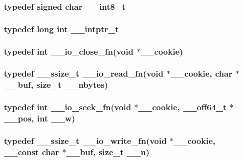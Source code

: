 \subsubsection[{\_\-\_\-int8\_\-t}]{\setlength{\rightskip}{0pt plus 5cm}typedef signed char {\bf \_\-\_\-int8\_\-t}}\label{tp_8c_ad354a21de2c1a620441cb09b93f96031}
\subsubsection[{\_\-\_\-intptr\_\-t}]{\setlength{\rightskip}{0pt plus 5cm}typedef long int {\bf \_\-\_\-intptr\_\-t}}\label{tp_8c_a075fd5c40c4d73666419b71350a65634}
\subsubsection[{\_\-\_\-io\_\-close\_\-fn}]{\setlength{\rightskip}{0pt plus 5cm}typedef int {\bf \_\-\_\-io\_\-close\_\-fn}(void $\ast$\_\-\_\-cookie)}\label{tp_8c_a6786b9a023567289213209656e55df6e}
\subsubsection[{\_\-\_\-io\_\-read\_\-fn}]{\setlength{\rightskip}{0pt plus 5cm}typedef {\bf \_\-\_\-ssize\_\-t} {\bf \_\-\_\-io\_\-read\_\-fn}(void $\ast$\_\-\_\-cookie, char $\ast$\_\-\_\-buf, {\bf size\_\-t} \_\-\_\-nbytes)}\label{tp_8c_ae0606271c38e8806f8183247cad8dcc7}
\subsubsection[{\_\-\_\-io\_\-seek\_\-fn}]{\setlength{\rightskip}{0pt plus 5cm}typedef int {\bf \_\-\_\-io\_\-seek\_\-fn}(void $\ast$\_\-\_\-cookie, {\bf \_\-\_\-off64\_\-t} $\ast$\_\-\_\-pos, int \_\-\_\-w)}\label{tp_8c_acbd4eda6a8012467619139ad9802a38d}
\subsubsection[{\_\-\_\-io\_\-write\_\-fn}]{\setlength{\rightskip}{0pt plus 5cm}typedef {\bf \_\-\_\-ssize\_\-t} {\bf \_\-\_\-io\_\-write\_\-fn}(void $\ast$\_\-\_\-cookie, \_\-\_\-const char $\ast$\_\-\_\-buf, {\bf size\_\-t} \_\-\_\-n)}\label{tp_8c_af1d3782321bafa325a8529727cf17a89}
